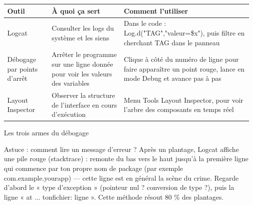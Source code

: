 


\begin{center}
\begin{tabularx}{\linewidth}{|X|X|X|}
\hline
\textbf{Outil} & \textbf{À quoi ça sert} & \textbf{Comment l’utiliser} \tabularnewline
\hline
Logcat & Consulter les logs du système et les siens & Dans le code : Log.d("TAG","valeur=\$x"), puis filtre en cherchant TAG dans le panneau \tabularnewline
Débogage par points d’arrêt & Arrêter le programme sur une ligne donnée pour voir les valeurs des variables & Clique à côté du numéro de ligne pour faire apparaître un point rouge, lance en mode Debug et avance pas à pas \tabularnewline
Layout Inspector & Observer la structure de l’interface en cours d’exécution & Menu Tools Layout Inspector, pour voir l’arbre des composants en temps réel \tabularnewline
\hline
\end{tabularx}
\end{center}

\begin{center}\small\color{gray}Les trois armes du débogage\end{center}

\begin{tcbinfo}{Astuce : comment lire un message d’erreur ?}
Après un plantage, Logcat affiche une pile rouge (stacktrace) : remonte du bas vers le haut jusqu’à la première ligne qui commence par ton propre nom de package (par exemple com.example.yourapp) — cette ligne est en général la scène du crime. Regarde d’abord le « type d’exception » (pointeur nul ? conversion de type ?), puis la ligne « at ... tonfichier: ligne ». Cette méthode résout 80 \% des plantages.

\end{tcbinfo}


